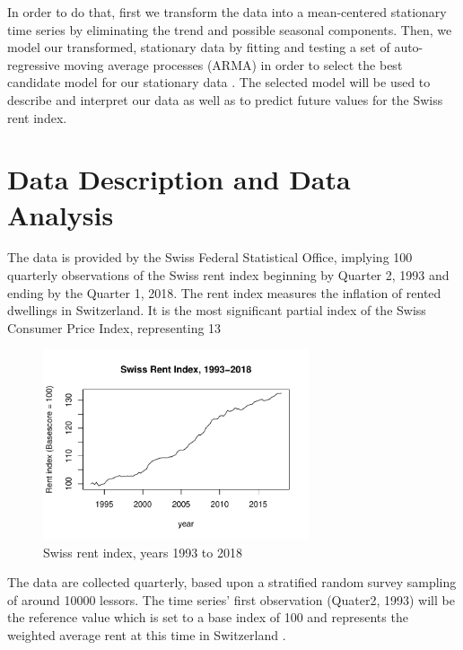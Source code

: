 \documentclass[11pt,a4paper]{article}
\begin{document}
In order to do that, first we transform the data into a mean-centered stationary time series by eliminating the trend and possible seasonal components.
Then, we model our transformed, stationary data by fitting and testing a set of auto-regressive moving average processes (ARMA) in order to select the best candidate model for our stationary data \cite[p.~82--110]{bd02}.
The selected model will be used to describe and interpret our data as well as to predict future values for the Swiss rent index.



\section{Data Description and Data Analysis}

The data is provided by the Swiss Federal Statistical Office, implying 100 quarterly observations of the Swiss rent index beginning by Quarter 2, 1993 and ending by the Quarter 1, 2018.
The rent index measures the inflation of rented dwellings in Switzerland.
It is the most significant partial index of the Swiss Consumer Price Index, representing 13%

\begin{figure} [ht]
    \centering
    \includegraphics[width=0.7\textwidth]{indiceloyers_timeseries}
    \caption{Swiss rent index, years 1993 to 2018}
    \label{fig:indiceloyers_timeseries}
\end{figure}

The data are collected quarterly, based upon a stratified random survey sampling of around \num{10000} lessors.
The time series' first observation (Quater2, 1993) will be the reference value which is set to a base index of 100 and represents the weighted average rent at this time in Switzerland \cite[p.~20--23]{ofs}.
\end{document}
